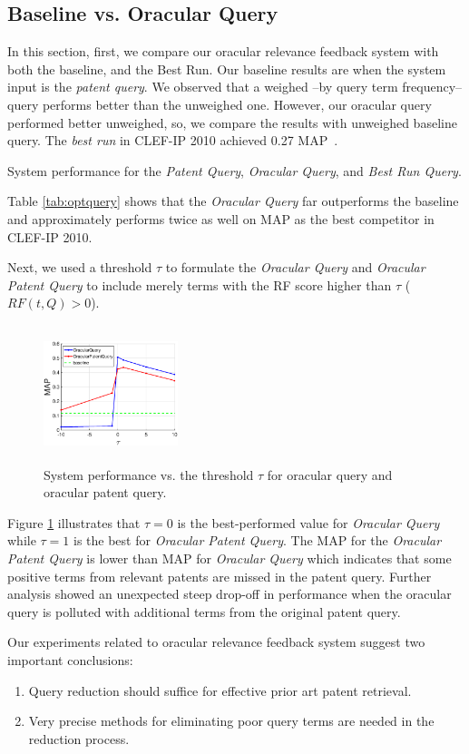 \subsection{Baseline vs. Oracular Query}
In this section, first, we compare our oracular relevance feedback system with both the baseline, and the Best Run. Our baseline results are when the system input is the {\em patent query}. We observed that a weighed --by query term frequency-- query performs better than the unweighed one. However, our oracular query performed better unweighed, so, we compare the results with unweighed baseline query. The {\em best run} in CLEF-IP 2010 achieved 0.27 MAP~\cite{lopez2010experiments}. 
\begin{table}[htpb]
  \begin{center}
   \caption{System performance for the {\em Patent Query}, {\em Oracular Query}, and {\em Best Run Query}.}
   \vspace*{1ex}
     
  \label{tab:optquery}
  \end{center}  
\end{table}
Table \ref{tab:optquery} shows that the {\em Oracular Query} far outperforms the baseline and approximately performs twice as well on MAP as the best competitor in CLEF-IP 2010.

Next, we used a threshold $\tau$ to formulate the {\em Oracular Query} and {\em Oracular Patent Query} to include merely terms with the RF score higher than $\tau$ ($RF(t,Q)>0$). 
\begin{figure}[htpb]
   \centering
   \includegraphics[width=0.35\textwidth,height=40mm]{figs/oracularquery3.eps}
   \caption{System performance vs. the threshold $\tau$ for oracular query and oracular patent query.}   
   \label{fig:oracular} 
\end{figure} 
Figure \ref{fig:oracular} illustrates that $\tau=0$ is the best-performed value for {\em Oracular Query} while $\tau=1$ is the best for {\em Oracular Patent Query}. The MAP for the {\em Oracular Patent Query} is lower than MAP for {\em Oracular Query} which indicates that some positive terms from relevant patents are missed in the patent query. Further analysis showed an unexpected steep drop-off in performance when the oracular query is polluted with additional terms from the original patent query. 

Our experiments related to oracular relevance feedback system suggest two important conclusions:
\begin{enumerate}
  \item Query reduction should suffice for effective prior art patent retrieval.
  \item Very precise methods for eliminating poor query terms are needed in the reduction process.
\end{enumerate}